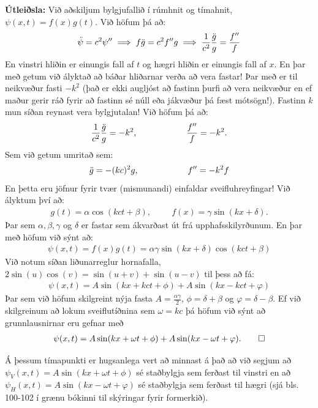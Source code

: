\textbf{Útleiðsla:} Við aðskiljum bylgjufallið í rúmhnit og tímahnit, $\psi(x,t) = f(x)g(t)$. Við höfum þá að:
\begin{align*}
    \Ddot{\psi} = c^2 \psi'' \implies f\Ddot{g} = c^2f'' g \implies \frac{1}{c^2} \frac{\Ddot{g}}{g} = \frac{f''}{f}
\end{align*}
En vinstri hliðin er einungis fall af $t$ og hægri hliðin er einungis fall af $x$. En þar með getum við ályktað að báðar hliðarnar verða að vera fastar! Þar með er til neikvæður fasti $-k^2$ (það er ekki augljóst að fastinn þurfi að vera neikvæður en ef maður gerir ráð fyrir að fastinn sé núll eða jákvæður þá fæst mótsögn!). Fastinn $k$ mun síðan reynast vera bylgjutalan! Við höfum þá að:
\begin{align*}
    \frac{1}{c^2} \frac{\Ddot{g}}{g} = -k^2, \hspace{2cm} \frac{f''}{f} = -k^2.
\end{align*}
Sem við getum umritað sem:
\begin{align*}
    \Ddot{g} = -(kc)^2g, \hspace{2cm} f'' = -k^2 f
\end{align*}
En þetta eru jöfnur fyrir tvær (mismunandi) einfaldar sveifluhreyfingar! Við ályktum því að:
\begin{align*}
    g(t) = \alpha \cos(kct + \beta), \hspace{1cm} f(x) = \gamma \sin(kx + \delta).
\end{align*}
Þar sem $\alpha, \beta, \gamma$ og $\delta$ er fastar sem ákvarðast út frá upphafsskilyrðunum. En þar með höfum við sýnt að:
\begin{align*}
\psi(x,t) = f(x)g(t) = \alpha \gamma \sin(kx + \delta) \cos(kct + \beta)
\end{align*}
Við notum síðan liðunarreglur hornafalla, $2\sin(u)\cos(v) = \sin(u+v) + \sin(u-v)$ til þess að fá:
\begin{align*}
    \psi(x,t) = A\sin(kx+kct + \phi) + A\sin(kx-kct + \varphi)
\end{align*}
Þar sem við höfum skilgreint nýja fasta $A = \frac{\alpha \gamma}{2}$, $\phi = \delta + \beta$ og $\varphi = \delta - \beta$. Ef við skilgreinum að lokum sveiflutíðnina sem $\omega = kc$ þá höfum við sýnt að grunnlausnirnar eru gefnar með
\begin{align*}
    \psi(x,t) = A\sin(kx + \omega t + \phi) + A\sin(kx - \omega t + \varphi). \qedhere
\end{align*}

Á þessum tímapunkti er hugsanlega vert að minnast á það að við segjum að $\psi_V(x,t) = A\sin(kx+\omega t + \phi)$ sé staðbylgja sem ferðast til vinstri en að $\psi_H(x,t) = A\sin(kx - \omega t + \varphi)$ sé staðbylgja sem ferðast til hægri (sjá bls. 100-102 í grænu bókinni til skýringar fyrir formerkið). 


